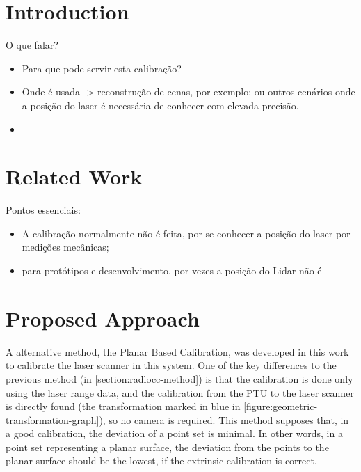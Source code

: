 \documentclass[conference]{IEEEtran}
\begin{document}
\section{Introduction}\label{sec:introduction}

O que falar?
\begin{itemize}
    \item Para que pode servir esta calibração?
    \item Onde é usada -> reconstrução de cenas, por exemplo; ou outros cenários onde a posição do laser é necessária de conhecer com elevada precisão.
    \item 
\end{itemize}

\section{Related Work}\label{sec:related_work}

Pontos essenciais:
\begin{itemize}
    \item A calibração normalmente não é feita, por se conhecer a posição do laser por medições mecânicas;
    \item para protótipos e desenvolvimento, por vezes a posição do Lidar não é 
\end{itemize}


\section{Proposed Approach}\label{sec:proposed_approach}

A alternative method, the Planar Based Calibration, was developed in this work to calibrate the laser scanner in this system. One of the key differences to the previous method (in \cref{section:radlocc-method}) is that the calibration is done only using the laser range data, and the calibration from the PTU to the laser scanner is directly found (the transformation marked in blue in \cref{figure:geometric-transformation-graph}), so no camera is required. This method supposes that, in a good calibration, the deviation of a point set is minimal. In other words, in a point set representing a planar surface, the deviation from the points to the planar surface should be the lowest, if the extrinsic calibration is correct.
\end{document}
